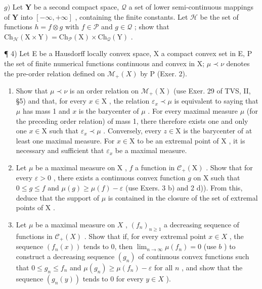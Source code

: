\(g)\) Let \(\mathbf{Y}\) be a second compact space, \(\mathcal{Q}\) a set of lower semi-continuous mappings of \(\mathbf{Y}\) into \([-\infty, +\infty]\) , containing the finite constants. Let \(\mathcal{H}\) be the set of functions \(h = f \otimes g\) with \(f \in \mathcal{P}\) and \(g \in \mathcal{Q}\) ; show that \(\mathrm{Ch}_{\mathcal{H}}(\mathrm{X} \times \mathrm{Y}) = \mathrm{Ch}_{\mathcal{P}}(\mathrm{X}) \times \mathrm{Ch}_{\mathcal{Q}}(\mathrm{Y})\) .

¶ 4) Let E be a Hausdorff locally convex space, X a compact convex set in E, P the set of finite numerical functions continuous and convex in X; \(\mu \prec \nu\) denotes the pre-order relation defined on \(\mathcal{M}_{+}(X)\) by P (Exer. 2).

\begin{enumerate}
\def\labelenumi{\alph{enumi})}
\item
  Show that \(\mu \prec \nu\) is an order relation on \(\mathcal{M}_{+}(\mathrm{X})\) (use Exer. 29 of TVS, II, §5) and that, for every \(x \in \mathrm{X}\) , the relation \(\varepsilon_x \prec \mu\) is equivalent to saying that \(\mu\) has mass 1 and \(x\) is the barycenter of \(\mu\) . For every maximal measure \(\mu\) (for the preceding order relation) of mass 1, there therefore exists one and only one \(x \in \mathrm{X}\) such that \(\varepsilon_x \prec \mu\) . Conversely, every \(z \in \mathrm{X}\) is the barycenter of at least one maximal measure. For \(x \in \mathrm{X}\) to be an extremal point of \(\mathrm{X}\) , it is necessary and sufficient that \(\varepsilon_x\) be a maximal measure.
\item
  Let \(\mu\) be a maximal measure on \(\mathrm{X}\) , \(f\) a function in \(\mathcal{C}_{+}(\mathrm{X})\) . Show that for every \(\varepsilon > 0\) , there exists a continuous convex function \(g\) on \(\mathrm{X}\) such that \(0 \leqslant g \leqslant f\) and \(\mu(g) \geqslant \mu(f) - \varepsilon\) (use Exers. 3 b) and 2 d)). From this, deduce that the support of \(\mu\) is contained in the closure of the set of extremal points of \(\mathrm{X}\) .
\item
  Let \(\mu\) be a maximal measure on \(X\) , \((f_n)_{n \geqslant 1}\) a decreasing sequence of functions in \(\mathcal{C}_+(X)\) . Show that if, for every extremal point \(x \in X\) , the sequence \((f_n(x))\) tends to 0, then \(\lim_{n \to \infty} \mu(f_n) = 0\) (use \(b\) ) to construct a decreasing sequence \((g_n)\) of continuous convex functions such that \(0 \leqslant g_n \leqslant f_n\) and \(\mu(g_n) \geqslant \mu(f_n) - \varepsilon\) for all \(n\) , and show that the sequence \((g_n(y))\) tends to 0 for every \(y \in X\) ).

\end{enumerate}
